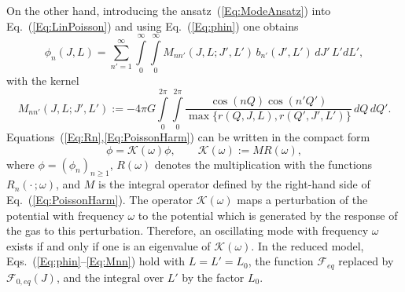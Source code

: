 On the other hand, introducing the ansatz~(\ref{Eq:ModeAnsatz}) into Eq.~(\ref{Eq:LinPoisson}) and using Eq.~(\ref{Eq:phin}) one obtains
\begin{equation}
\phi_n(J,L) = \sum\limits_{n'=1}^\infty\int\limits_0^\infty\int\limits_0^\infty M_{nn'}(J,L;J',L')\, b_{n'}(J',L')\, dJ'\, L' dL',
\label{Eq:PoissonHarm}
\end{equation}
with the kernel
\begin{equation}
M_{nn'}(J,L;J',L') := -4\pi G\int\limits_0^{2\pi}\int\limits_0^{2\pi} \frac{\cos(nQ)\cos(n'Q')}{\max\{ r(Q,J,L),r(Q',J',L') \}}\, dQ\, dQ'.
\label{Eq:Mnn}
\end{equation}
Equations~(\ref{Eq:Rn},\ref{Eq:PoissonHarm}) can be written in the compact form
\begin{equation}
\phi = \mathcal{K}(\omega)\phi,\qquad
\mathcal{K}(\omega) := M R(\omega),
\label{Eq:Loop}
\end{equation}
where $\phi = (\phi_n)_{n\geq 1}$, $R(\omega)$ denotes the multiplication with the functions $R_n(\cdot\,;\omega)$, and $M$ is the integral operator defined by the right-hand side of Eq.~(\ref{Eq:PoissonHarm}). The operator $\mathcal{K}(\omega)$ maps a perturbation of the potential with frequency $\omega$ to the potential which is generated by the response of the gas to this perturbation. Therefore, an oscillating mode with frequency $\omega$ exists if and only if one is an eigenvalue of $\mathcal{K}(\omega)$. In the reduced model, Eqs.~(\ref{Eq:phin}--\ref{Eq:Mnn}) hold with $L = L' = L_0$, the function $\mathcal{F}_{eq}$ replaced by $\mathcal{F}_{0,eq}(J)$, and the integral over $L'$ by the factor $L_0$.

